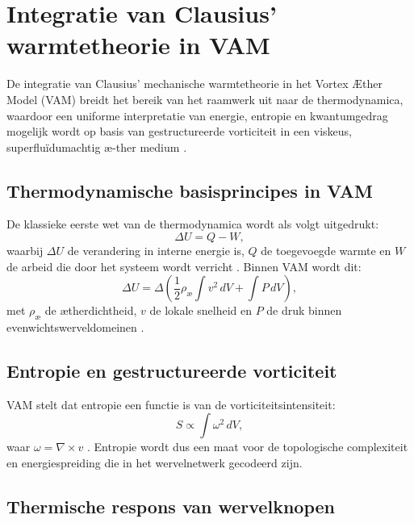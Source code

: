 \section{Integratie van Clausius' warmtetheorie in VAM}

De integratie van Clausius' mechanische warmtetheorie in het Vortex Æther Model (VAM) breidt het bereik van het raamwerk uit naar de thermodynamica,
waardoor een uniforme interpretatie van energie, entropie en kwantumgedrag mogelijk wordt op basis van gestructureerde vorticiteit in een viskeus, superfluïdumachtig \ae-ther
medium \cite{clausius1865mechanisch, maxwell1865elektromagnetisch, helmholtz1858integralen}.

\subsection{Thermodynamische basisprincipes in VAM}

De klassieke eerste wet van de thermodynamica wordt als volgt uitgedrukt:
\begin{equation}
\Delta U = Q - W,\label{eq:first_law_thermodynamics}
\end{equation}
waarbij $\Delta U$ de verandering in interne energie is, $Q$ de toegevoegde warmte en $W$ de arbeid die door het systeem wordt verricht \cite{clausius1865mechanical}. Binnen VAM wordt dit:
\begin{equation}
\Delta U = \Delta \left( \frac{1}{2} \rho_{\text{\ae}} \int v^2 \, dV + \int P \, dV \right),\label{eq:first_law_vam}
\end{equation}
met $\rho_{\text{\ae}}$ de ætherdichtheid, $v$ de lokale snelheid en $P$ de druk binnen evenwichtswerveldomeinen \cite{vam2025unified}.

\subsection{Entropie en gestructureerde vorticiteit}

VAM stelt dat entropie een functie is van de vorticiteitsintensiteit:
\begin{equation}
S \propto \int \omega^2 \, dV,\label{eq:entropy_vorticity}
\end{equation}
waar $\omega = \nabla \times v$ \cite{kelvin1867vortex}. Entropie wordt dus een maat voor de topologische complexiteit en energiespreiding die in het wervelnetwerk gecodeerd zijn.

\subsection{Thermische respons van wervelknopen}

